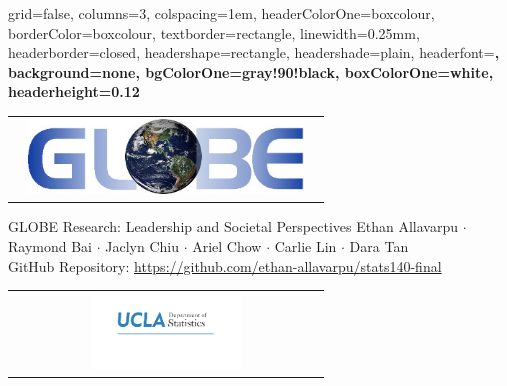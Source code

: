 \documentclass[landscape,a0paper,fontscale=0.34]{baposter}
\begin{document}
\begin{poster}{
 grid=false,
 columns=3,
 colspacing=1em,
 headerColorOne=boxcolour, %
 borderColor=boxcolour,
 textborder=rectangle,
 linewidth=0.25mm,
 headerborder=closed,
 headershape=rectangle,
 headershade=plain,
 headerfont=\large\rmfamily\bf,
 background=none,
 bgColorOne=gray!90!black,
 boxColorOne=white,
 headerheight=0.12\textheight}
 {
  \begin{tabular}{c}
    \includegraphics[height=2cm, width = 8cm]{globe.jpg}%
  \end{tabular}
 }
 {\huge \centering GLOBE Research: Leadership and Societal Perspectives}
{\vspace{0.2cm} Ethan Allavarpu $\cdot$ Raymond Bai $\cdot$ Jaclyn Chiu $\cdot$ Ariel Chow $\cdot$ Carlie Lin $\cdot$ Dara Tan \\ \vspace{0.2cm} \large GitHub Repository: \url{https://github.com/ethan-allavarpu/stats140-final}}
 {
  \begin{tabular}{c}
    \includegraphics[height=2cm, width = 8cm]{ps_statistics_DoS} %
  \end{tabular}
 }


\end{poster}
\end{document}
